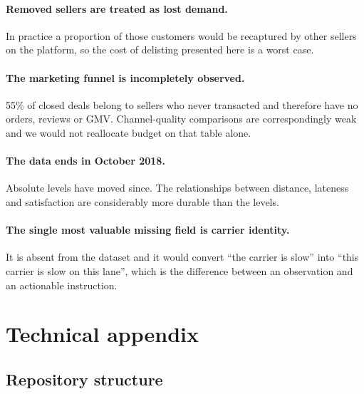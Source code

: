 \documentclass[11pt,a4paper]{article}
\begin{document}
\paragraph{Removed sellers are treated as lost demand.} In practice a proportion of
those customers would be recaptured by other sellers on the platform, so the cost of
delisting presented here is a worst case.

\paragraph{The marketing funnel is incompletely observed.} 55\% of closed deals
belong to sellers who never transacted and therefore have no orders, reviews or
GMV. Channel-quality comparisons are correspondingly weak and we would not
reallocate budget on that table alone.

\paragraph{The data ends in October 2018.} Absolute levels have moved since. The
relationships between distance, lateness and satisfaction are considerably more
durable than the levels.

\paragraph{The single most valuable missing field is carrier identity.} It is absent
from the dataset and it would convert ``the carrier is slow'' into ``this carrier
is slow on this lane'', which is the difference between an observation and an
actionable instruction.

\section{Technical appendix}
\label{sec:appendix}

\subsection{Repository structure}
\end{document}
